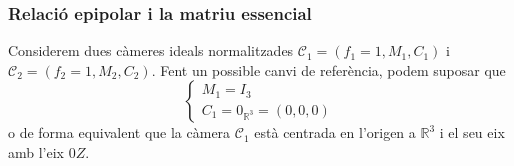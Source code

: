 \documentclass[../main.tex]{subfiles}
\begin{document}
	\subsubsection{Relació epipolar i la matriu essencial}
	Considerem dues càmeres ideals normalitzades $\mathcal{C}_1 = (f_1=1, M_1, C_1)$ i $\mathcal{C}_2 = (f_2=1, M_2, C_2)$. Fent un possible canvi de referència, podem suposar que
	\begin{displaymath}
		\begin{cases}
			M_1 = I_3\\
			C_1 = 0_{\mathbb{R}^3} = \left(0,0,0\right)
		\end{cases}
	\end{displaymath}
	o de forma equivalent que la càmera $\mathcal{C}_1$ està centrada en l'origen a $\mathbb{R}^3$ i el seu eix amb l'eix $0Z$.\\
\end{document}
